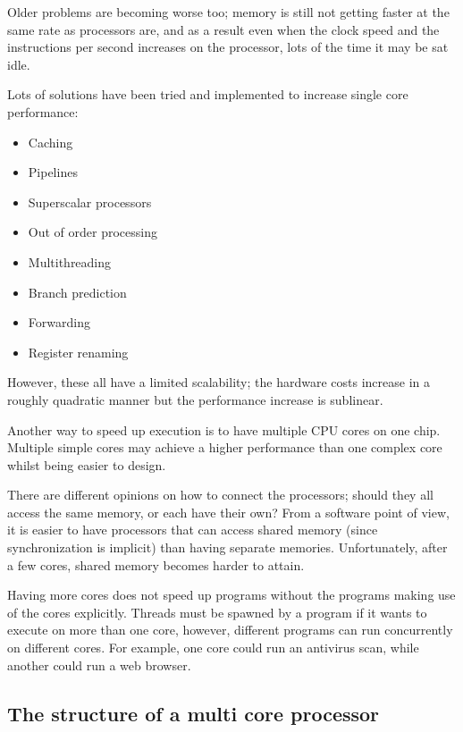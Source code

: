 Older problems are becoming worse too; memory is still not getting faster at the
same rate as processors are, and as a result even when the clock speed and the
instructions per second increases on the processor, lots of the time it may be
sat idle.

Lots of solutions have been tried and implemented to increase single core
performance:

\begin{mymulticols}
  \begin{itemize}
    \item Caching
    \item Pipelines
    \item Superscalar processors
    \item Out of order processing
    \item Multithreading
    \item Branch prediction
    \item Forwarding
    \item Register renaming
  \end{itemize}
\end{mymulticols}

However, these all have a limited scalability; the hardware costs increase in a
roughly quadratic manner but the performance increase is sublinear.

Another way to speed up execution is to have multiple CPU cores on one chip.
Multiple simple cores may achieve a higher performance than one complex core
whilst being easier to design.

There are different opinions on how to connect the processors; should they all
access the same memory, or each have their own? From a software point of view,
it is easier to have processors that can access shared memory (since
synchronization is implicit) than having separate memories. Unfortunately,
after a few cores, shared memory becomes harder to attain.

Having more cores does not speed up programs without the programs making use of
the cores explicitly. Threads must be spawned by a program if it wants to
execute on more than one core, however, different programs can run concurrently
on different cores. For example, one core could run an antivirus scan, while
another could run a web browser.

\subsection{The structure of a multi core processor}

